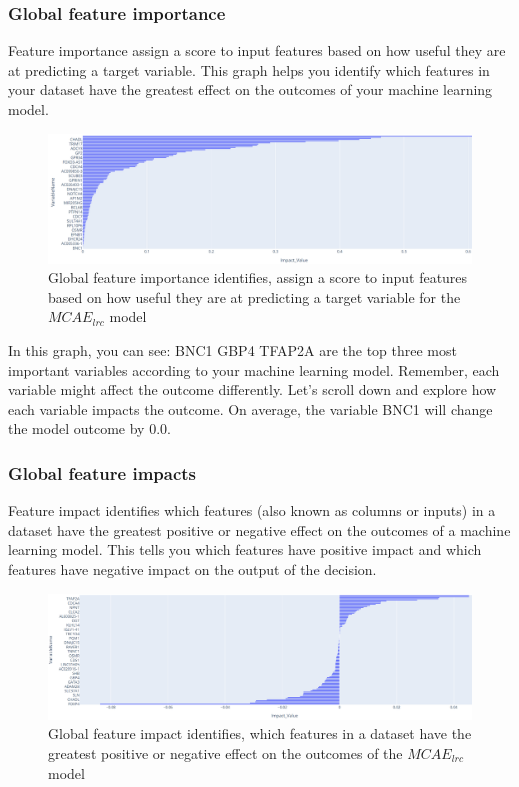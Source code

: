 \subsubsection{Global feature importance}
Feature importance assign a score to input features based on how useful they are at predicting a target variable. This graph helps you identify which features in your dataset have the greatest effect on the outcomes of your machine learning model. 

\begin{figure}[h]
    \centering
	\includegraphics[scale=0.8]{images/global_fi_1.png}
	\caption{Global feature importance identifies, assign a score to input features based on how useful they are at predicting a target variable for the $MCAE_{lrc}$  model}
    \label{fig:global_feature_importance}
\end{figure}

\hspace*{3.5mm} In this graph, you can see: BNC1 GBP4 TFAP2A are the top three most important variables according to your machine learning model. Remember, each variable might affect the outcome differently. Let’s scroll down and explore how each variable impacts the outcome. On average, the variable BNC1 will change the model outcome by 0.0. 

\subsubsection{Global feature impacts}
Feature impact identifies which features (also known as columns or inputs) in a dataset have the greatest positive or negative effect on the outcomes of a machine learning model. This tells you which features have positive impact and which features have negative impact on the output of the decision. 

\begin{figure}[h]
    \centering
	\includegraphics[scale=0.8]{images/global_fi_2.png}
	\caption{Global feature impact identifies, which features in a dataset have the greatest positive or negative effect on the outcomes of the $MCAE_{lrc}$  model}
    \label{fig:global_feature_impacts}
\end{figure}

